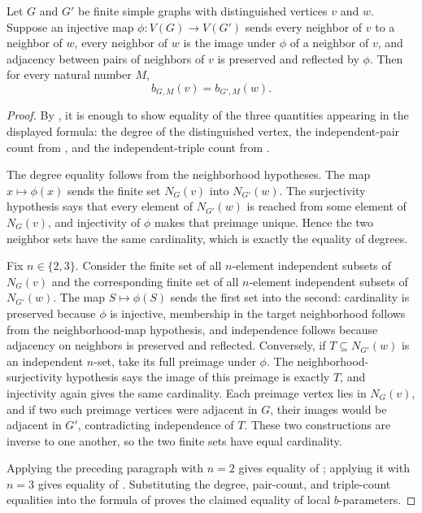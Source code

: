 \begin{helper}
Let $G$ and $G'$ be finite simple graphs with distinguished vertices $v$
and $w$.  Suppose an injective map $\phi:V(G)\to V(G')$ sends every
neighbor of $v$ to a neighbor of $w$, every neighbor of $w$ is the image
under $\phi$ of a neighbor of $v$, and adjacency between pairs of neighbors
of $v$ is preserved and reflected by $\phi$.  Then for every natural number
$M$,
\[
b_{G,M}(v)=b_{G',M}(w).
\]
\end{helper}
\begin{proof}
By , it is enough to show equality of the three
quantities appearing in the displayed formula: the degree of the
distinguished vertex, the independent-pair count from
, and the independent-triple count from
.

The degree equality follows from the neighborhood hypotheses.  The map
$x\mapsto\phi(x)$ sends the finite set $N_G(v)$ into $N_{G'}(w)$.  The
surjectivity hypothesis says that every element of $N_{G'}(w)$ is reached
from some element of $N_G(v)$, and injectivity of $\phi$ makes that preimage
unique.  Hence the two neighbor sets have the same cardinality, which is
exactly the equality of degrees.

Fix $n\in\{2,3\}$.  Consider the finite set of all $n$-element independent
subsets of $N_G(v)$ and the corresponding finite set of all $n$-element
independent subsets of $N_{G'}(w)$.  The map $S\mapsto\phi(S)$ sends the
first set into the second: cardinality is preserved because $\phi$ is
injective, membership in the target neighborhood follows from the
neighborhood-map hypothesis, and independence follows because adjacency on
neighbors is preserved and reflected.  Conversely, if
$T\subseteq N_{G'}(w)$ is an independent $n$-set, take its full preimage
under $\phi$.  The neighborhood-surjectivity hypothesis says the image of
this preimage is exactly $T$, and injectivity again gives the same
cardinality.  Each preimage vertex lies in $N_G(v)$, and if two such
preimage vertices were adjacent in $G$, their images would be adjacent in
$G'$, contradicting independence of $T$.  These two constructions are
inverse to one another, so the two finite sets have equal cardinality.

Applying the preceding paragraph with $n=2$ gives equality of
; applying it with $n=3$ gives equality of
.  Substituting the degree, pair-count, and
triple-count equalities into the formula of 
proves the claimed equality of local $b$-parameters.
\end{proof}
